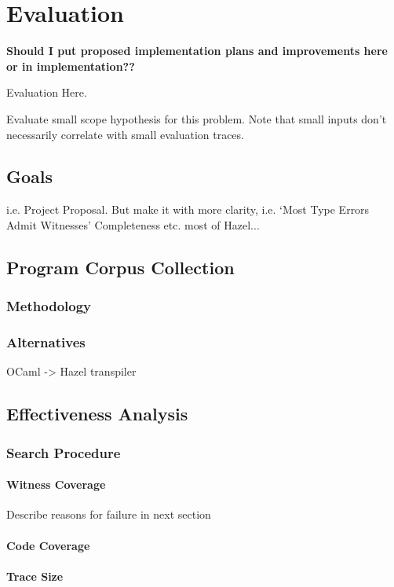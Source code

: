 \chapter{Evaluation}\label{chap:Evaluation}
\textbf{Should I put proposed implementation plans and improvements here or in implementation??}

Evaluation Here.\par 
Evaluate small scope hypothesis for this problem. Note that small inputs don't necessarily correlate with small evaluation traces.

\section{Goals}\label{sec:EvaluationGoals}
i.e. Project Proposal. But make it with more clarity, i.e. `Most Type Errors Admit Witnesses'
Completeness etc. most of Hazel...

\section{Program Corpus Collection}\label{sec:CorpusCollection}
\subsection{Methodology}
\subsection{Alternatives}
OCaml -> Hazel transpiler

\section{Effectiveness Analysis}\label{sec:EffectivenessAnalysis}

\subsection{Search Procedure}
\subsubsection{Witness Coverage}
Describe reasons for failure in next section
\subsubsection{Code Coverage}
\subsubsection{Trace Size}
